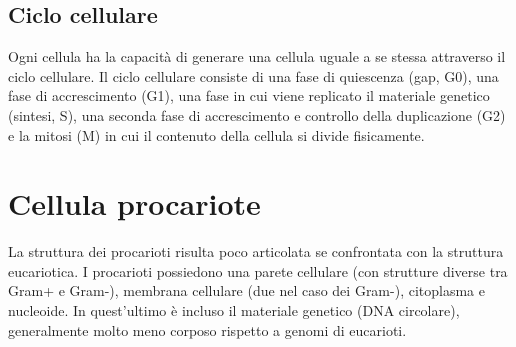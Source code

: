     \subsection{Ciclo cellulare}
        Ogni cellula ha la capacità di generare una cellula uguale a se stessa attraverso il ciclo cellulare. Il ciclo cellulare consiste di una fase di quiescenza (gap, G0), una fase di accrescimento (G1), una fase in cui viene replicato il materiale genetico (sintesi, S), una seconda fase di accrescimento e controllo della duplicazione (G2) e la mitosi (M) in cui il contenuto della cellula si divide fisicamente.

\section{Cellula procariote}
    La struttura dei procarioti risulta poco articolata se confrontata con la struttura eucariotica. I procarioti possiedono una parete cellulare (con strutture diverse tra Gram+ e Gram-), membrana cellulare (due nel caso dei Gram-), citoplasma e nucleoide. In quest'ultimo è incluso il materiale genetico (DNA circolare), generalmente molto meno corposo rispetto a genomi di eucarioti. 

